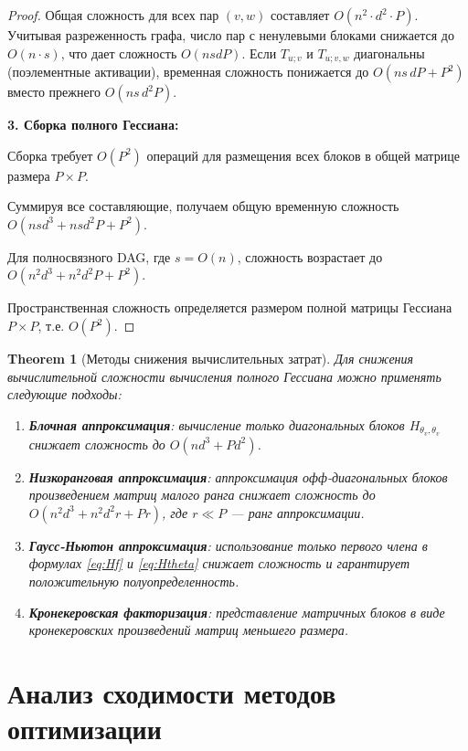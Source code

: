 \documentclass[11pt]{article}
\newtheorem{theorem}{Theorem}
\begin{document}
\begin{proof}
  Общая сложность для всех пар $(v,w)$ составляет $O(n^2 \cdot d^2 \cdot P)$. Учитывая разреженность графа,
  число пар с ненулевыми блоками снижается до $O(n \cdot s)$, что дает сложность $O(n s d P)$.
  Если $T_{u;v}$ и $T_{u;v,w}$ диагональны (поэлементные активации), временная сложность понижается до
  $O(ns\,dP + P^{2})$ вместо прежнего $O(ns\,d^{2}P)$.

  \textbf{3. Сборка полного Гессиана:}

  Сборка требует $O(P^2)$ операций для размещения всех блоков в общей матрице размера $P \times P$.

  Суммируя все составляющие, получаем общую временную сложность $O(n s d^3 + n s d^2 P + P^2)$.

  Для полносвязного DAG, где $s = O(n)$, сложность возрастает до $O(n^2 d^3 + n^2 d^2 P + P^2)$.

  Пространственная сложность определяется размером полной матрицы Гессиана $P \times P$, т.е. $O(P^2)$.
\end{proof}

\begin{theorem}[Методы снижения вычислительных затрат]
  Для снижения вычислительной сложности вычисления полного Гессиана можно применять следующие подходы:
  \begin{enumerate}
    \item \textbf{Блочная аппроксимация}: вычисление только диагональных блоков $H_{\theta_v, \theta_v}$
      снижает сложность до $O(n d^3 + P d^2)$.
    \item \textbf{Низкоранговая аппроксимация}: аппроксимация офф-диагональных блоков произведением матриц
      малого ранга снижает сложность до $O(n^2 d^3 + n^2 d^2 r + P r)$, где $r \ll P$ — ранг аппроксимации.
    \item \textbf{Гаусс-Ньютон аппроксимация}: использование только первого члена в формулах \eqref{eq:Hf} и
      \eqref{eq:Htheta} снижает сложность и гарантирует положительную полуопределенность.
    \item \textbf{Кронекеровская факторизация}: представление матричных блоков в виде кронекеровских
      произведений матриц меньшего размера.
  \end{enumerate}
\end{theorem}

\section{Анализ сходимости методов оптимизации}
\end{document}
